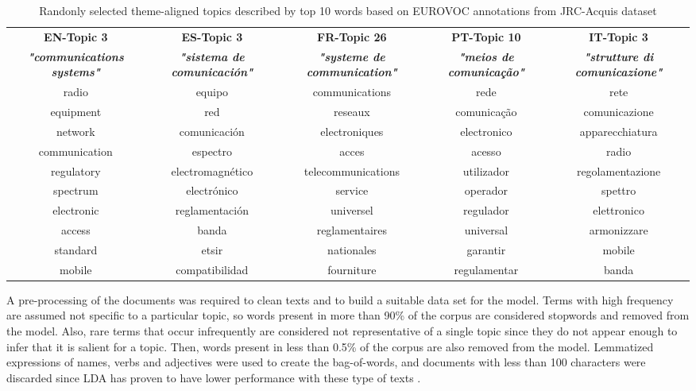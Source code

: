 \begin{table}[ht]\centering
  \small
  \noindent
  \begin{tabularx}{\linewidth}{@{} CCCCC @{}}
  \hline
 \textbf{EN-Topic 3} & \textbf{ES-Topic 3} & \textbf{FR-Topic 26} & \textbf{PT-Topic 10} & \textbf{IT-Topic 3}  \\
\textbf{\textit{{\scriptsize "communications systems"}}} & \textbf{\textit{{\scriptsize "sistema de comunicaci\'on"}}} & \textbf{\textit{{\scriptsize "systeme de communication"}}} & \textbf{\textit{{\scriptsize "meios de comunicação"}}} & \textbf{\textit{{\scriptsize "strutture di comunicazione"}}} \\ 
  \hline
     radio          & equipo                & communications		& rede         & rete        \\
     equipment      & red                   & reseaux            & comunicação   & comunicazione        \\
     network        & comunicaci\'on        & electroniques      & electronico    & apparecchiatura        \\
     communication  & espectro              & acces              & acesso    & radio        \\
     regulatory     & electromagn\'etico    & telecommunications & utilizador & regolamentazione            \\
     spectrum       & electr\'onico         & service            & operador & spettro           \\
     electronic     & reglamentaci\'on      & universel          & regulador    & elettronico                  \\
     access         & banda                 & reglamentaires     & universal        & armonizzare        \\
     standard       & etsir                 & nationales         & garantir   & mobile         \\
     mobile         & compatibilidad        & fourniture         & regulamentar  & banda          \\
    \bottomrule
  \end{tabularx}
\caption{Randonly selected theme-aligned topics described by top 10 words based on EUROVOC annotations from JRC-Acquis dataset}
\label{tb:topics}
\end{table}

 A pre-processing of the documents was required to clean texts and to build a suitable data set for the model. Terms with high frequency are assumed not specific to a particular topic, so words present in more than 90\% of the corpus are considered stopwords and removed from the model. Also, rare terms that occur infrequently are considered not representative of a single topic since they do not appear enough to infer that it is salient for a topic. Then, words present in less than 0.5\% of the corpus are also removed from the model. Lemmatized expressions of names, verbs and adjectives were used to create the bag-of-words, and documents with less than 100 characters were discarded since LDA has proven to have lower performance with these type of texts \citep{Cheng2014a}. 
 

